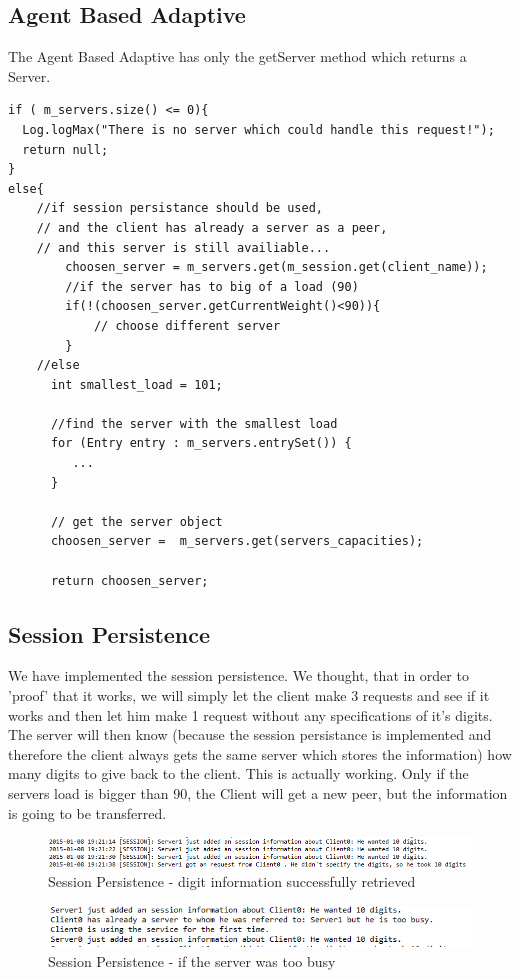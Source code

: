 \documentclass[12pt]{article}
\begin{document}
\subsection{Agent Based Adaptive} 
The Agent Based Adaptive has only the getServer method which returns a Server.
\begin{lstlisting}  
if ( m_servers.size() <= 0){
  Log.logMax("There is no server which could handle this request!");
  return null;
}
else{
	//if session persistance should be used, 
	// and the client has already a server as a peer, 
	// and this server is still availiable...
		choosen_server = m_servers.get(m_session.get(client_name));		
		//if the server has to big of a load (90)
		if(!(choosen_server.getCurrentWeight()<90)){
			// choose different server	
		}
	//else
	  int smallest_load = 101;
 	  
 	  //find the server with the smallest load
	  for (Entry entry : m_servers.entrySet()) {
	     ...
	  }
				
	  // get the server object
	  choosen_server =  m_servers.get(servers_capacities);
				
	  return choosen_server;
\end{lstlisting}  

\subsection{Session Persistence}
We have implemented the session persistence. We thought, that in order to 'proof' that it works, we will simply let the client make 3 requests and see if it works and then let him make 1 request without any specifications of it's digits. \\
The server will then know (because the session persistance is implemented and therefore the client always gets the same server which stores the information) how many digits to give back to the client.
This is actually working. Only if the servers load is bigger than 90, the Client will get a new peer, but the information is going to be transferred.
\begin{figure}[here!]
\centering
    \includegraphics[width=1.0\textwidth]{images/sp}
    \caption{Session Persistence - digit information successfully retrieved}
    \label{fig:sp}
\end{figure}
\begin{figure}[here!]
\centering
    \includegraphics[width=1.0\textwidth]{images/sp2}
    \caption{Session Persistence - if the server was too busy}
    \label{fig:sp2}
\end{figure}
\end{document}
